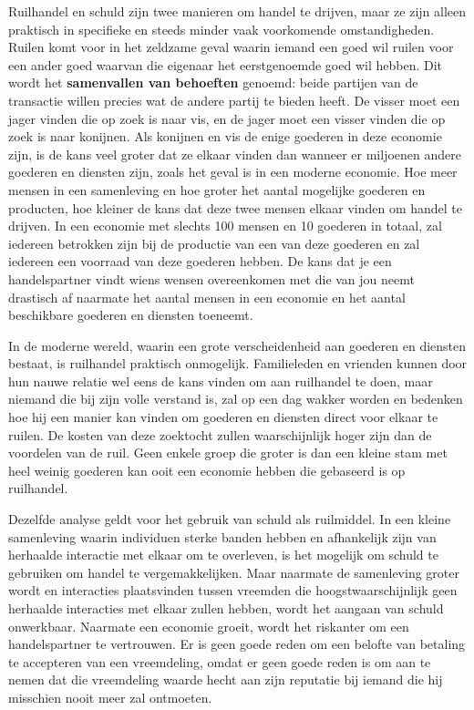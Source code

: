 Ruilhandel en schuld zijn twee manieren om handel te drijven, maar ze zijn alleen praktisch in specifieke en steeds minder vaak voorkomende omstandigheden. Ruilen komt voor in het zeldzame geval waarin iemand een goed wil ruilen voor een ander goed waarvan die eigenaar het eerstgenoemde goed wil hebben. Dit wordt het \textbf{samenvallen van behoeften} genoemd: beide partijen van de transactie willen precies wat de andere partij te bieden heeft. De visser moet een jager vinden die op zoek is naar vis, en de jager moet een visser vinden die op zoek is naar konijnen. Als konijnen en vis de enige goederen in deze economie zijn, is de kans veel groter dat ze elkaar vinden dan wanneer er miljoenen andere goederen en diensten zijn, zoals het geval is in een moderne economie. Hoe meer mensen in een samenleving en hoe groter het aantal mogelijke goederen en producten, hoe kleiner de kans dat deze twee mensen elkaar vinden om handel te drijven. In een economie met slechts 100 mensen en 10 goederen in totaal, zal iedereen betrokken zijn bij de productie van een van deze goederen en zal iedereen een voorraad van deze goederen hebben. De kans dat je een handelspartner vindt wiens wensen overeenkomen met die van jou neemt drastisch af naarmate het aantal mensen in een economie en het aantal beschikbare goederen en diensten toeneemt.

In de moderne wereld, waarin een grote verscheidenheid aan goederen en diensten bestaat, is ruilhandel praktisch onmogelijk. Familieleden en vrienden kunnen door hun nauwe relatie wel eens de kans vinden om aan ruilhandel te doen, maar niemand die bij zijn volle verstand is, zal op een dag wakker worden en bedenken hoe hij een manier kan vinden om goederen en diensten direct voor elkaar te ruilen. De kosten van deze zoektocht zullen waarschijnlijk hoger zijn dan de voordelen van de ruil. Geen enkele groep die groter is dan een kleine stam met heel weinig goederen kan ooit een economie hebben die gebaseerd is op ruilhandel.

Dezelfde analyse geldt voor het gebruik van schuld als ruilmiddel. In een kleine samenleving waarin individuen sterke banden hebben en afhankelijk zijn van herhaalde interactie met elkaar om te overleven, is het mogelijk om schuld te gebruiken om handel te vergemakkelijken. Maar naarmate de samenleving groter wordt en interacties plaatsvinden tussen vreemden die hoogstwaarschijnlijk geen herhaalde interacties met elkaar zullen hebben, wordt het aangaan van schuld onwerkbaar. Naarmate een economie groeit, wordt het riskanter om een handelspartner te vertrouwen. Er is geen goede reden om een belofte van betaling te accepteren van een vreemdeling, omdat er geen goede reden is om aan te nemen dat die vreemdeling waarde hecht aan zijn reputatie bij iemand die hij misschien nooit meer zal ontmoeten.

